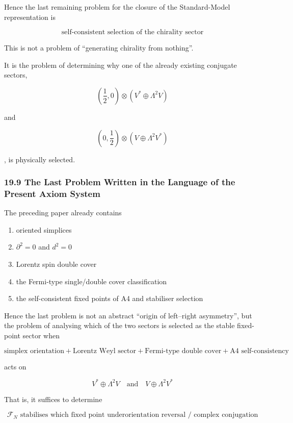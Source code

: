 \documentclass[
  a4paper,
]{article}
\providecommand{\tightlist}{%
  \setlength{\itemsep}{0pt}\setlength{\parskip}{0pt}}
\begin{document}
Hence the last remaining problem for the closure of the Standard-Model
representation is

\[
\boxed{
\text{self-consistent selection of the chirality sector}
}
\tag{142}
\]

This is not a problem of ``generating chirality from nothing''.

It is the problem of determining why one of the already existing
conjugate sectors,

\[
\left(\frac12,0\right)
\otimes
(V^*\oplus\Lambda^2V)
\]

and

\[
\left(0,\frac12\right)
\otimes
(V\oplus\Lambda^2V^*)
\]

, is physically selected.

\subsubsection{19.9 The Last Problem Written in the Language of the
Present Axiom
System}\label{the-last-problem-written-in-the-language-of-the-present-axiom-system}

The preceding paper already contains

\begin{enumerate}
\def\labelenumi{\arabic{enumi}.}
\tightlist
\item
  oriented simplices
\item
  \(\partial^2=0\) and \(d^2=0\)
\item
  Lorentz spin double cover
\item
  the Fermi-type single/double cover classification
\item
  the self-consistent fixed points of A4 and stabiliser selection
\end{enumerate}

Hence the last problem is not an abstract ``origin of left--right
asymmetry'', but the problem of analysing which of the two sectors is
selected as the stable fixed-point sector when

\[
\boxed{
\text{simplex orientation}
+
\text{Lorentz Weyl sector}
+
\text{Fermi-type double cover}
+
\text{A4 self-consistency}
}
\tag{143}
\]

acts on

\[
\boxed{
V^*\oplus\Lambda^2V
}
\quad\text{and}\quad
\boxed{
V\oplus\Lambda^2V^*
}
\tag{144}
\]

That is, it suffices to determine

\[
\boxed{
\mathcal F_N
\text{ stabilises which fixed point under}
\text{orientation reversal / complex conjugation}
}
\tag{145}
\]
\end{document}
